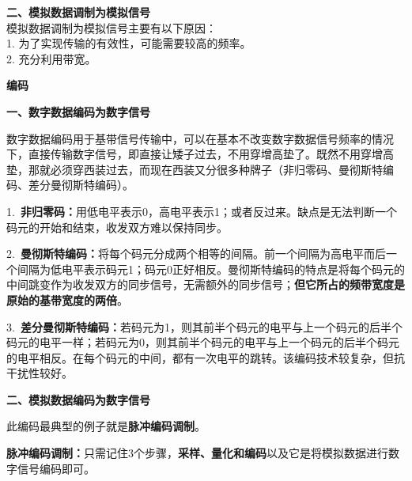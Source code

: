 \textbf{{二、模拟数据调制为模拟信号}}\\
模拟数据调制为模拟信号主要有以下原因：\\
1. 为了实现传输的有效性，可能需要较高的频率。\\
2. 充分利用带宽。

\textbf{{编码}}

\textbf{{一、数字数据编码为数字信号}}

数字数据编码用于基带信号传输中，可以在基本不改变数字数据信号频率的情况下，直接传输数字信号，即直接让矮子过去，不用穿增高垫了。既然不用穿增高垫，那就必须穿西装过去，而现在西装又分很多种牌子（非归零码、曼彻斯特编码、差分曼彻斯特编码）。

1.~\textbf{非归零码：}用低电平表示0，高电平表示1；或者反过来。缺点是无法判断一个码元的开始和结束，收发双方难以保持同步。

2.~\textbf{曼彻斯特编码：}将每个码元分成两个相等的间隔。前一个间隔为高电平而后一个间隔为低电平表示码元1；码元0正好相反。曼彻斯特编码的特点是将每个码元的中间跳变作为收发双方的同步信号，无需额外的同步信号；\textbf{但它所占的频带宽度是原始的基带宽度的两倍}。

3.~\textbf{差分曼彻斯特编码：}若码元为1，则其前半个码元的电平与上一个码元的后半个码元的电平一样；若码元为0，则其前半个码元的电平与上一个码元的后半个码元的电平相反。在每个码元的中间，都有一次电平的跳转。该编码技术较复杂，但抗干扰性较好。

\textbf{{二、}{模拟数据编码为数字信号}}

此编码最典型的例子就是\textbf{脉冲编码调制}。

\textbf{脉冲编码调制：}只需记住3个步骤，\textbf{采样、量化和编码}以及它是将模拟数据进行数字信号编码即可。
